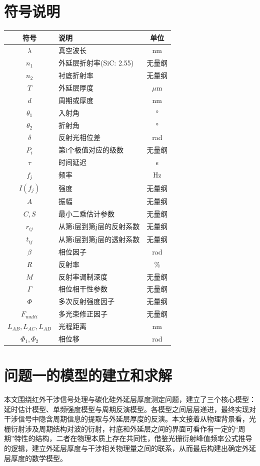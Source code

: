 \documentclass[withoutpreface,bwprint]{cumcmthesis}
\begin{document}
\section{符号说明}
\begin{table}[H]
\centering
\begin{tabularx}{\textwidth}{CLC}
\toprule
符号 & 说明 & 单位 \\
\midrule
$\lambda$ & 真空波长 & nm \\
$n_1$ & 外延层折射率(SiC: 2.55) & 无量纲 \\
$n_2$ & 衬底折射率 & 无量纲 \\
$T$ & 外延层厚度 & $\mu$m \\
$d$ & 周期或厚度 & nm \\
$\theta_1$ & 入射角 & ° \\
$\theta_2$ & 折射角 & ° \\
$\delta$ & 反射光相位差 & rad \\
$P_i$ & 第i个极值对应的级数 & 无量纲 \\
$\tau$ & 时间延迟 & s \\
$f_j$ & 频率 & Hz \\
$I(f_j)$ & 强度 & 无量纲 \\
$A$ & 振幅 & 无量纲 \\
$C, S$ & 最小二乘估计参数 & 无量纲 \\
$r_{ij}$ & 从第i层到第j层的反射系数 & 无量纲 \\
$t_{ij}$ & 从第i层到第j层的透射系数 & 无量纲 \\
$\beta$ & 相位因子 & rad \\
$R$ & 反射率 & \% \\
$M$ & 反射率调制深度 & 无量纲 \\
$\Gamma$ & 相位相干性参数 & 无量纲 \\
$\Phi$ & 多次反射强度因子 & 无量纲 \\
$F_{multi}$ & 多光束修正因子 & 无量纲 \\
$L_{AB}, L_{AC}, L_{AD}$ & 光程距离 & nm \\
$\Phi_1, \Phi_2$ & 相位移 & rad \\
\bottomrule
\end{tabularx}
\label{tab:符号说明}
\end{table}



\section{问题一的模型的建立和求解}
本文围绕红外干涉信号处理与碳化硅外延层厚度测定问题，建立了三个核心模型：延时估计模型、单频强度模型与周期反演模型。各模型之间层层递进，最终实现对干涉信号中隐含周期信息的提取与外延层厚度的反演。本文接着从物理背景看，光栅衍射涉及周期结构对波的衍射，衬底和外延层之间的界面可看作有一定的“周期”特性的结构，二者在物理本质上存在共同性，借鉴光栅衍射峰值频率公式推导的逻辑，建立外延层厚度与干涉相关物理量之间的联系，从而最后构建出确定外延层厚度的数学模型。
\end{document}
